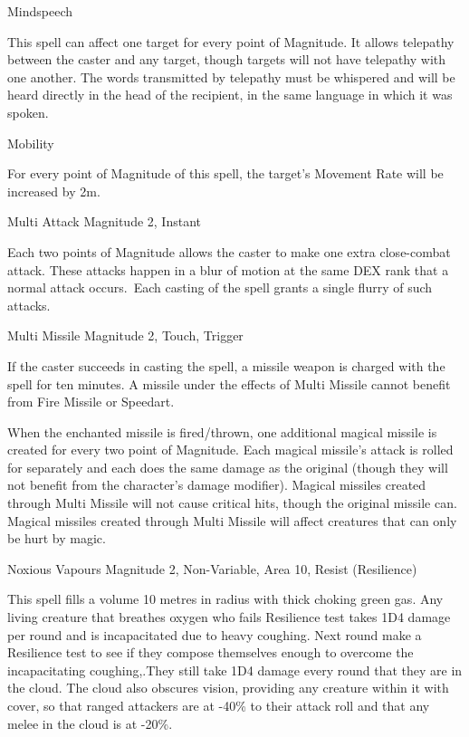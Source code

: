 \begin{rpg-spell}
{Mindspeech}
{}

This spell can affect one target for every point of Magnitude. It allows telepathy between the caster and any target, though targets will not have telepathy with one another. The words transmitted by telepathy must be whispered and will be heard directly in the head of the recipient, in the same language in which it was spoken. 
\end{rpg-spell}


\begin{rpg-spell}
{Mobility}
{}

For every point of Magnitude of this spell, the target’s Movement Rate will be increased by 2m.
\end{rpg-spell}


\begin{rpg-spell}
{Multi Attack}
{Magnitude 2, Instant}

Each two points of Magnitude allows the caster to make one extra close-combat attack. These attacks happen in a blur of motion at the same DEX rank that a normal attack occurs. Each casting of the spell grants a single flurry of such attacks.
\end{rpg-spell}


\begin{rpg-spell}
{Multi Missile}
{Magnitude 2, Touch, Trigger}

If the caster succeeds in casting the spell, a missile weapon is charged with the spell for ten minutes. A missile under the effects of Multi Missile cannot benefit from Fire Missile or Speedart. 

When the enchanted missile is fired/thrown, one additional magical missile is created for every two point of Magnitude. Each magical missile’s attack is rolled for separately and each does the same damage as the original (though they will not benefit from the character’s damage modifier). Magical missiles created through Multi Missile will not cause critical hits, though the original missile can. Magical missiles created through Multi Missile will affect creatures that can only be hurt by magic. 
\end{rpg-spell}


\begin{rpg-spell}
{Noxious Vapours}
{Magnitude 2, Non-Variable, Area 10, Resist (Resilience)}

This spell fills a volume 10 metres in radius with thick choking green gas. Any living creature that breathes oxygen who fails Resilience test takes 1D4 damage per round and is incapacitated due to heavy coughing. Next round make a Resilience test to see if they compose themselves enough to overcome the incapacitating coughing,.They still take 1D4 damage every round that they are in the cloud. The cloud also obscures vision, providing any creature within it with cover, so that ranged attackers are at -40\% to their attack roll and that any melee in the cloud is at -20\%.
\end{rpg-spell}


